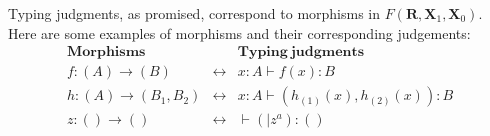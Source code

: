\documentclass[pra,floatfix,
amsmath,superscriptaddress, 12pt]{article}
\theoremstyle{definition}
\begin{document}
Typing judgments, as promised, correspond to morphisms in $F(\mathbf{R},\mathbf{X}_1,\mathbf{X}_0)$. Here are some examples of morphisms and their corresponding judgements:
%
\begin{eqnarray*}
    \mathbf{Morphisms}
        &
          &
          \mathbf{Typing \ judgments} \\
    f:(A) \longrightarrow (B)
        &
        \longleftrightarrow
            &  x:A\vdash f\left(x\right):B
                \\
    h:(A)\longrightarrow\left(B_{1},B_{2}\right)
        &
        \longleftrightarrow
            &
            x:A\vdash\left(h_{\left(1\right)}\left(x\right),h_{\left(2\right)}\left(x\right)\right):B
                \\
    z:() \longrightarrow ()
        &
        \longleftrightarrow
            &
            \vdash\left(|z^{a}\right):\left(\right)
\end{eqnarray*}
\end{document}

